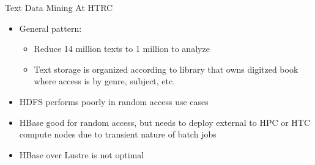 \documentclass[newPxFont]{beamer}
\begin{document}
\begin{frame}[c]{Text Data Mining At HTRC}
  \begin{itemize}
    \item General pattern: 
    \begin{itemize}
      \item Reduce 14 million texts to 1 million to analyze
      \item Text storage is organized according to library  that owns digitzed book where access is  by genre, subject, etc.
    \end{itemize}
    \item HDFS performs poorly in random access use cases
    \item HBase good for random access, but needs to deploy external to HPC or HTC compute nodes due to transient nature of batch jobs
    \item HBase over Lustre is not optimal
  \end{itemize}
\end{frame}
\end{document}
